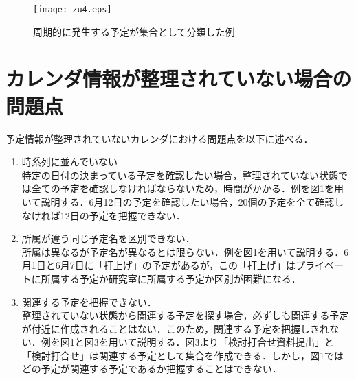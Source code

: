\documentclass[fleqn, 14pt]{extarticlej}
\begin{document}
\begin{figure}
  \begin{center}
    \texttt{[image: zu4.eps]}
    \caption{周期的に発生する予定が集合として分類した例}
  \end{center}
\end{figure}

\newpage
\section{カレンダ情報が整理されていない場合の問題点}
予定情報が整理されていないカレンダにおける問題点を以下に述べる．
\begin{enumerate}
	\item 時系列に並んでいない\\
	  特定の日付の決まっている予定を確認したい場合，整理されていない状態では全ての予定を確認しなければならないため，時間がかかる．例を図1を用いて説明する．6月12日の予定を確認したい場合，20個の予定を全て確認しなければ12日の予定を把握できない．

	\item 所属が違う同じ予定名を区別できない．\\
		所属は異なるが予定名が異なるとは限らない．例を図1を用いて説明する．6月1日と6月7日に「打上げ」の予定があるが，この「打上げ」はプライベートに所属する予定か研究室に所属する予定か区別が困難になる．
		
	\item 関連する予定を把握できない．\\
		整理されていない状態から関連する予定を探す場合，必ずしも関連する予定が付近に作成されることはない．このため，関連する予定を把握しきれない．例を図1と図3を用いて説明する．図3より「検討打合せ資料提出」と「検討打合せ」は関連する予定として集合を作成できる．しかし，図1ではどの予定が関連する予定であるか把握することはできない．

		
	
\end{enumerate}

\end{document}
